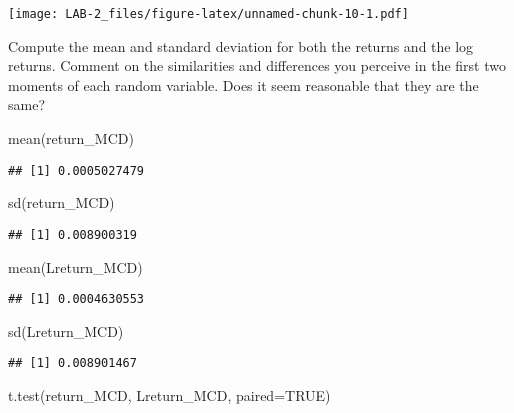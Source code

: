 \documentclass[
]{article}
\newenvironment{Shaded}{\begin{snugshade}}{\end{snugshade}}
\newcommand{\AttributeTok}[1]{\textcolor[rgb]{0.77,0.63,0.00}{#1}}
\newcommand{\ConstantTok}[1]{\textcolor[rgb]{0.00,0.00,0.00}{#1}}
\newcommand{\FunctionTok}[1]{\textcolor[rgb]{0.00,0.00,0.00}{#1}}
\newcommand{\NormalTok}[1]{#1}
\begin{document}
\texttt{[image: LAB-2\_files/figure-latex/unnamed-chunk-10-1.pdf]}

Compute the mean and standard deviation for both the returns and the log
returns. Comment on the similarities and differences you perceive in the
first two moments of each random variable. Does it seem reasonable that
they are the same?

\begin{Shaded}
\begin{Highlighting}[]
\FunctionTok{mean}\NormalTok{(return\_MCD)}
\end{Highlighting}
\end{Shaded}

\begin{verbatim}
## [1] 0.0005027479
\end{verbatim}

\begin{Shaded}
\begin{Highlighting}[]
\FunctionTok{sd}\NormalTok{(return\_MCD)}
\end{Highlighting}
\end{Shaded}

\begin{verbatim}
## [1] 0.008900319
\end{verbatim}

\begin{Shaded}
\begin{Highlighting}[]
\FunctionTok{mean}\NormalTok{(Lreturn\_MCD)}
\end{Highlighting}
\end{Shaded}

\begin{verbatim}
## [1] 0.0004630553
\end{verbatim}

\begin{Shaded}
\begin{Highlighting}[]
\FunctionTok{sd}\NormalTok{(Lreturn\_MCD)}
\end{Highlighting}
\end{Shaded}

\begin{verbatim}
## [1] 0.008901467
\end{verbatim}

\begin{Shaded}
\begin{Highlighting}[]
\FunctionTok{t.test}\NormalTok{(return\_MCD, Lreturn\_MCD, }\AttributeTok{paired=}\ConstantTok{TRUE}\NormalTok{)}
\end{Highlighting}
\end{Shaded}
\end{document}
